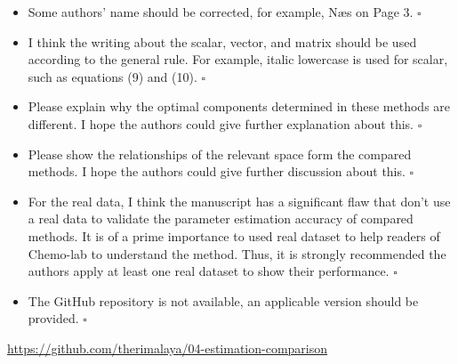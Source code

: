 \documentclass[11pt, a4paper]{article}
\begin{document}
\begin{itemize}[leftmargin=1em]
    
\item Some authors' name should be corrected, for example, N{\ae}s on Page 3. \todo{\textcolor{mycolor1}{Fixed.}}$\square$

\item I think the writing about the scalar, vector, and matrix should be used
  according to the general rule. For example, italic lowercase is used for
  scalar, such as equations (9) and (10).
   $\square$

\item Please explain why the optimal components determined in these methods are different. I hope the authors could give further explanation about this. 
 $\square$

\item Please show the relationships of the relevant space form the compared
  methods. I hope the authors could give further discussion about this.
   $\square$

\item For the real data, I think the manuscript has a significant flaw that don't use a real data to validate the parameter estimation accuracy of compared methods. It is of a prime importance to used real dataset to help readers of Chemo-lab to understand the method. Thus, it is strongly recommended the authors apply at least one real dataset to show their performance. $\square$ 

\item The GitHub repository is not available, an applicable version should be provided.  $\square$

\end{itemize}

\textcolor{mycolor1}{\href{https://github.com/therimalaya/04-estimation-comparison}{\small\url{https://github.com/therimalaya/04-estimation-comparison}}}
\end{document}
